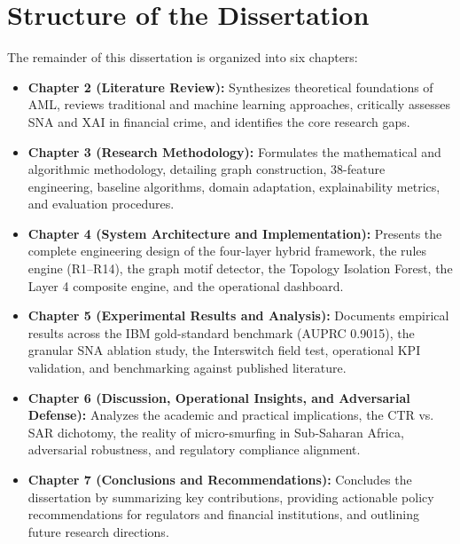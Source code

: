 \section{Structure of the Dissertation}
The remainder of this dissertation is organized into six chapters:
\begin{itemize}
    \item \textbf{Chapter 2 (Literature Review):} Synthesizes theoretical foundations of AML, reviews traditional and machine learning approaches, critically assesses SNA and XAI in financial crime, and identifies the core research gaps.
    \item \textbf{Chapter 3 (Research Methodology):} Formulates the mathematical and algorithmic methodology, detailing graph construction, 38-feature engineering, baseline algorithms, domain adaptation, explainability metrics, and evaluation procedures.
    \item \textbf{Chapter 4 (System Architecture and Implementation):} Presents the complete engineering design of the four-layer hybrid framework, the rules engine (R1--R14), the graph motif detector, the Topology Isolation Forest, the Layer 4 composite engine, and the operational dashboard.
    \item \textbf{Chapter 5 (Experimental Results and Analysis):} Documents empirical results across the IBM gold-standard benchmark (AUPRC 0.9015), the granular SNA ablation study, the Interswitch field test, operational KPI validation, and benchmarking against published literature.
    \item \textbf{Chapter 6 (Discussion, Operational Insights, and Adversarial Defense):} Analyzes the academic and practical implications, the CTR vs. SAR dichotomy, the reality of micro-smurfing in Sub-Saharan Africa, adversarial robustness, and regulatory compliance alignment.
    \item \textbf{Chapter 7 (Conclusions and Recommendations):} Concludes the dissertation by summarizing key contributions, providing actionable policy recommendations for regulators and financial institutions, and outlining future research directions.
\end{itemize}
